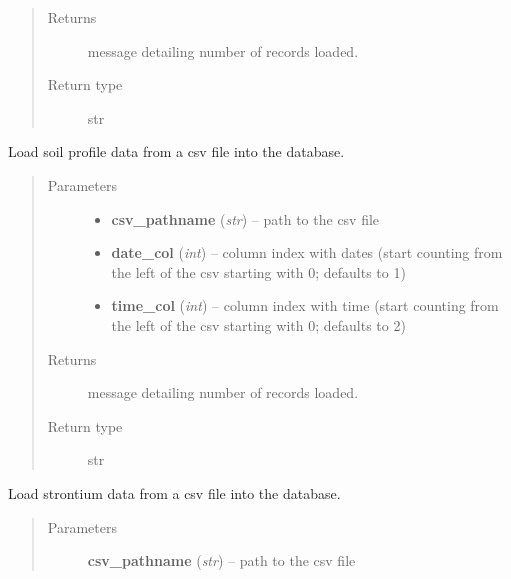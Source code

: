 \documentclass[letterpaper,10pt,english]{sphinxmanual}
\begin{document}
\begin{fulllineitems}
\begin{fulllineitems}
\begin{quote}
\begin{description}
\item[{Returns}] \leavevmode
message detailing number of records loaded.

\item[{Return type}] \leavevmode
str

\end{description}\end{quote}

\end{fulllineitems}


\begin{fulllineitems}
\label{modules:webb_utils.upload_data.UploadData.load_soil_profile_data}
Load soil profile data from a csv file into the database.
\begin{quote}\begin{description}
\item[{Parameters}] \leavevmode\begin{itemize}
\item {} 
\textbf{csv\_pathname} (\emph{str}) -- path to the csv file

\item {} 
\textbf{date\_col} (\emph{int}) -- column index with dates (start counting from the left of the csv starting with 0; defaults to 1)

\item {} 
\textbf{time\_col} (\emph{int}) -- column index with time (start counting from the left of the csv starting with 0; defaults to 2)

\end{itemize}

\item[{Returns}] \leavevmode
message detailing number of records loaded.

\item[{Return type}] \leavevmode
str

\end{description}\end{quote}

\end{fulllineitems}


\begin{fulllineitems}
\label{modules:webb_utils.upload_data.UploadData.load_strontium_isotope_data}
Load strontium data from a csv file into the database.
\begin{quote}\begin{description}
\item[{Parameters}] \leavevmode
\textbf{csv\_pathname} (\emph{str}) -- path to the csv file


\end{description}
\end{quote}
\end{fulllineitems}
\end{fulllineitems}
\end{document}
